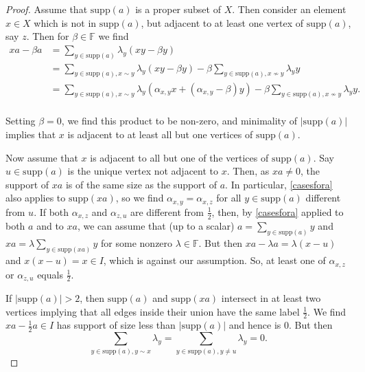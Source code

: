 \documentclass[oneside,a4paper]{amsart} %
\theoremstyle{definition}
\begin{document}
\begin{proof}
Assume that $\mathrm{supp}(a)$ is a proper subset of $X$.
Then consider an element $x\in X$ which is not in $\mathrm{supp}(a)$, but adjacent to at least one vertex of $\mathrm{supp}(a)$, say $z$.
Then for $\beta\in \mathbb{F}$ we find
$$\begin{array}{ll}
xa-\beta a
&=\displaystyle\sum_{y\in \mathrm{supp}(a)} \lambda_y (xy-\beta y)\\
&=\displaystyle\sum_{y\in \mathrm{supp}(a),x\sim y}  \lambda_y(xy-\beta y)-\beta \sum_{y\in \mathrm{supp}(a),x\not\sim y} \lambda_y y\\
&=\displaystyle\sum_{y\in \mathrm{supp}(a),x\sim y} \lambda_y(\alpha_{x,y} x +(\alpha_{x,y}-\beta) y)-\beta \sum_{y\in \mathrm{supp}(a),x\not\sim y} \lambda_y y.\\

\end{array}$$

Setting  $\beta=0$, we find this product to be non-zero, and 
minimality of $|\mathrm{supp}(a)|$ implies that $x$ is adjacent to at least all but one vertices of $\mathrm{supp}(a)$.



Now assume that  $x$ is adjacent to all but one of the vertices of $\mathrm{supp}(a)$. Say $u\in \mathrm{supp}(a)$ is the unique vertex not adjacent to $x$.
Then, as $xa\neq 0$,  the support of $xa$ is of the same size  as the support of $a$.
In particular,  \cref{casesfora} also applies to $\mathrm{supp}(xa)$, so we find $\alpha_{x,y}=\alpha_{x,z}$ for all $y\in \mathrm{supp}(a)$ different from $u$. 
If both $\alpha_{x,z}$ and $\alpha_{z,u}$ are different from $\frac{1}{2}$, then, by \cref{casesfora} applied to both  $a$ and to $xa$, we can assume
that (up to a scalar) $a= \displaystyle\sum_{y\in \mathrm{supp}(a)} y$ and $xa=\lambda\displaystyle\sum_{y\in \mathrm{supp}(xa)} y$ for some nonzero $\lambda\in\mathbb{F}$.
But then $xa-\lambda a=\lambda (x-u)$ and $x(x-u)=x\in I$, which is against our assumption.
So, at least one of $\alpha_{x,z}$ or $\alpha_{z,u}$ equals $\frac{1}{2}$.

 
If $|\mathrm{supp}(a)|>2$, then  $\mathrm{supp}(a)$ and $\mathrm{supp}(xa)$ intersect in at least two vertices implying that all
edges inside their union have the same label $\frac{1}{2}$.
We find  $xa-\frac{1}{2} a\in I$ has support of size less than $|\mathrm{supp}(a)|$ and hence  is $0$.
But then   
$$\displaystyle\sum_{y\in \mathrm{supp}(a),y\sim x} \lambda_y =\displaystyle\sum_{y\in \mathrm{supp}(a),y\neq u} \lambda_y=0.$$


\end{proof}
\end{document}
